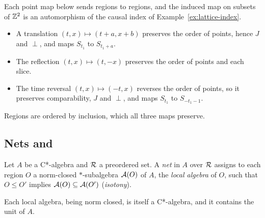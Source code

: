 \begin{extra}
\begin{example}\label{ex:lattice-aut}
Each point map below sends regions to regions, and the induced map on subsets of $\mathbb Z^2$ is an
automorphism of the causal index of Example~\ref{ex:lattice-index}.
\begin{itemize}[leftmargin=2em]
\item A translation $(t,x)\mapsto(t+a,x+b)$ preserves the order of points, hence $J$ and
$\perp$, and maps $S_{t_1}$ to $S_{t_1+a}$.
\item The reflection $(t,x)\mapsto(t,-x)$ preserves the order of points and each slice.
\item The time reversal $(t,x)\mapsto(-t,x)$ reverses the order of points, so it preserves
comparability, $J$ and $\perp$, and maps $S_{t_1}$ to $S_{-t_1-1}$.
\end{itemize}
Regions are ordered by inclusion, which all three maps preserve. 
\end{example}
\end{extra}

\begin{remark}\label{rem:time-orientation}
\end{remark}

\subsection{Nets and }

\begin{definition}[Net]\label{def:net}
Let $A$ be a C*-algebra and $\mathcal R$ a preordered set. A \emph{net} in $A$ over $\mathcal R$ assigns to
each region $O$ a norm-closed $*$-subalgebra $\mathcal A(O)$ of $A$, the \emph{local algebra} of $O$,
such that $O\leq O'$ implies $\mathcal A(O)\subseteq\mathcal A(O')$ (\emph{isotony}).
\end{definition}
\noindent Each local algebra, being norm closed, is itself a C*-algebra, and it contains the unit of
$A$.

